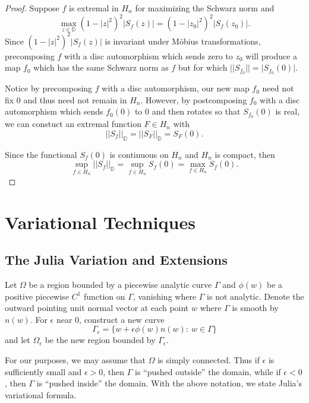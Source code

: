 \documentclass{lms}
\newcommand{\D}{\mathbb D}
\newcommand{\abs}[1]{\lvert#1\rvert}
\newcommand{\norm}[1]{\lvert\lvert#1\rvert\rvert}
\newcommand{\e}{\epsilon}
\numberwithin{equation}{section}
\begin{document}
\begin{proof}
Suppose $f$ is extremal in $H_n$ for maximizing the Schwarz norm and
\[
\max_{z\in\D} (1-\abs{z}^2)^2\abs{S_f(z)}= (1-\abs{z_0}^2)^2\abs{S_f(z_0)}.
\]
Since $(1-\abs{z}^2)^2\abs{S_f(z)}$ is 
invariant under M\"obius transformations,
precomposing $f$ with a disc automorphism which sends zero to $z_0$
will produce a map $f_0$  which has the same Schwarz norm as $f$ but for
which $\norm{S_{f_0}}= \abs{S_{f_0}(0)}$.  

Notice by precomposing $f$ with a disc automorphism,
our new map $f_0$ need not fix $0$ and thus need not remain in $H_n$.
However, by postcomposing $f_0$ with a disc automorphism which 
sends $f_0(0)$ to $0$ and then rotates so that $S_{f_0}(0)$ is real,
  we can constuct an extremal function  $F\in H_n$ with
\[
\norm{S_f}_\D=\norm{S_F}_\D=S_{F}(0).
\]

Since the functional $S_f(0)$ is continuous on $H_n$ and $H_n$ is compact,
then
\[
\sup_{f\in H_n} \norm{S_f}_\D = \sup_{f\in H_n} S_f(0) = 
\max_{f\in H_n} S_f(0).
\]
\end{proof}









\section{Variational Techniques}\label{S:twovar}

\subsection{The Julia Variation and Extensions}\label{S:julia}

Let $\Omega$ be a region bounded by a piecewise analytic curve $\Gamma$ and 
$\phi(w)$ be a positive piecewise $C^1$ function on $\Gamma$, vanishing
where $\Gamma$ is not analytic.  Denote the outward pointing 
unit normal vector at each point $w$ where $\Gamma$ is smooth by $n(w)$.
For $\epsilon$ near $0$, construct a new curve 
\[
\Gamma_\epsilon=\{w+\epsilon\phi(w)n(w):\: w\in\Gamma\}
\]
and let $\Omega_\epsilon$ be the new region bounded by $\Gamma_\e$.

For our purposes, we may assume that $\Omega$ is simply connected.  Thus
if $\epsilon$ is sufficiently small and
$\epsilon >0$, then $\Gamma$  is ``pushed outside'' the
domain, while if $\epsilon < 0$, then $\Gamma$  is ``pushed inside'' the
domain.
With the above notation, we state Julia's 
variational formula.
\end{document}
